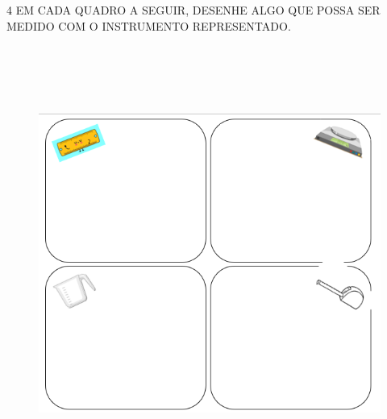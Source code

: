 \pagebreak
\num{4} EM CADA QUADRO A SEGUIR, DESENHE ALGO QUE POSSA SER MEDIDO COM O INSTRUMENTO REPRESENTADO.


\begin{figure}[htpb!]
\centering
\includegraphics[width=6.43650in,height=5.62891in]{media/image26.png}
\end{figure}

